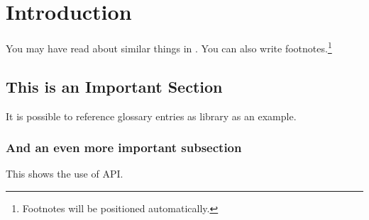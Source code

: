 \chapter{Introduction}\label{ch:intro}

You may have read about similar things in \cite{Goodliffe2007}.
You can also write footnotes.\footnote{Footnotes will be positioned automatically.}
\blindtext

\blindtext

\section{This is an Important Section}

It is possible to reference glossary entries as \gls{library} as an example.
\blindtext

\subsection{And an even more important subsection}

This shows the use of \ac{API}.
\blindtext
